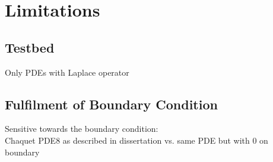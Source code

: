 \documentclass[./\jobname.tex]{subfiles}
\begin{document}
\chapter{Limitations}

\section{Testbed}
Only PDEs with Laplace operator

\section{Fulfilment of Boundary Condition}
Sensitive towards the boundary condition: \\
Chaquet PDE8 as described in dissertation vs. same PDE but with 0 on boundary
\end{document}
